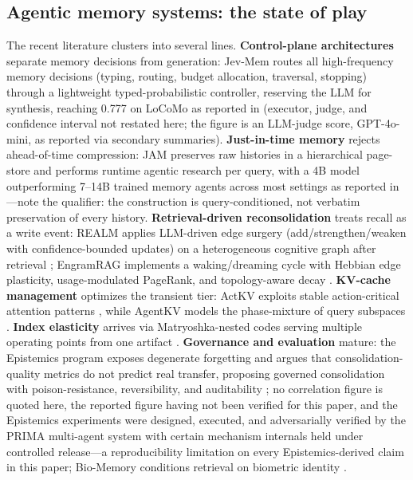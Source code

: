 \documentclass[11pt,a4paper]{article}
\begin{document}
\subsection{Agentic memory systems: the state of play}

The recent literature clusters into several lines. \textbf{Control-plane
architectures} separate memory decisions from generation: Jev-Mem routes
all high-frequency memory decisions (typing, routing, budget allocation,
traversal, stopping) through a lightweight typed-probabilistic controller,
reserving the LLM for synthesis, reaching 0.777 on LoCoMo as reported in
\cite{jevmem} (executor, judge, and confidence interval not restated
here; the figure is an LLM-judge score, GPT-4o-mini, as reported via
secondary summaries).
\textbf{Just-in-time memory} rejects ahead-of-time compression: JAM preserves raw histories in a hierarchical
page-store and performs runtime agentic research per query, with a 4B model
outperforming 7--14B trained memory agents across most settings as reported
in \cite{jam}---note the qualifier: the construction is query-conditioned,
not verbatim preservation of every history.
\textbf{Retrieval-driven reconsolidation} treats recall as a write event:
REALM applies LLM-driven edge surgery (add/strengthen/weaken with
confidence-bounded updates) on a heterogeneous cognitive graph after
retrieval \cite{realm}; EngramRAG implements a waking/dreaming cycle with
Hebbian edge plasticity, usage-modulated PageRank, and topology-aware decay
\cite{engramrag}. \textbf{KV-cache management} optimizes the transient
tier: ActKV exploits stable action-critical attention patterns
\cite{actkv}, while AgentKV models the phase-mixture of query subspaces
\cite{agentkv}. \textbf{Index elasticity} arrives via Matryoshka-nested
codes serving multiple operating points from one artifact
\cite{mhr,mrvq,kusupati2022}.
\textbf{Governance and evaluation} mature: the Epistemics program exposes
degenerate forgetting and argues that consolidation-quality metrics do not
predict real transfer, proposing governed consolidation with
poison-resistance, reversibility, and auditability \cite{epistemics};
no correlation figure is quoted here, the reported figure having not been
verified for this paper, and the Epistemics experiments were designed,
executed, and adversarially verified by the PRIMA multi-agent system with
certain mechanism internals held under controlled release---a
reproducibility limitation on every Epistemics-derived claim in this
paper;
Bio-Memory conditions retrieval on biometric identity \cite{biomem}.
\end{document}
